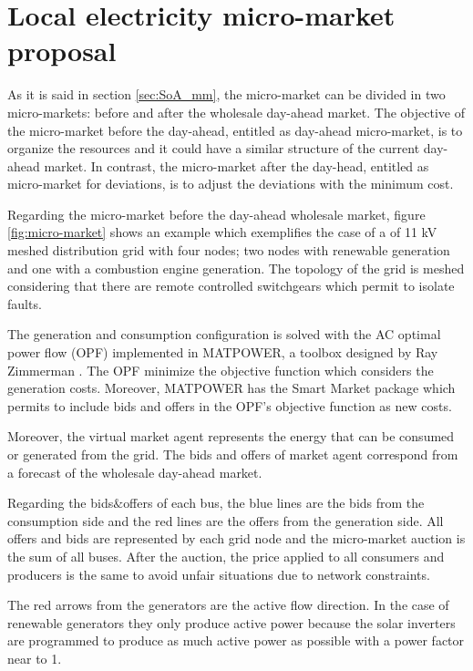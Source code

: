 \documentclass[a4paper,11pt,twoside,openright]{report}
\begin{document}
\section{Local electricity micro-market proposal}

As it is said in section \ref{sec:SoA_mm}, the micro-market can be divided in two micro-markets: before and after the wholesale day-ahead market. 
The objective of the micro-market before the day-ahead, entitled as day-ahead micro-market, is to organize the resources and it could have a similar structure of the current day-ahead market.
In contrast, the micro-market after the day-head, entitled as micro-market for deviations, is to adjust the deviations with the minimum cost.

Regarding the micro-market before the day-ahead wholesale market, figure \ref{fig:micro-market} shows an example which exemplifies the case of a  of 11 kV meshed distribution grid with four nodes; two nodes with renewable generation and one with a combustion engine generation. The topology of the grid is meshed considering that there are remote controlled switchgears which permit to isolate faults.

The generation and consumption configuration is solved with the AC optimal power flow (OPF) implemented in MATPOWER, a toolbox designed by Ray Zimmerman \cite{MATPOOWER}. The OPF minimize the objective function which considers the generation costs. Moreover, MATPOWER has the Smart Market package which permits to include bids and offers in the OPF's objective function as new costs.

Moreover, the virtual market agent represents the energy that can be consumed or generated from the grid. The bids and offers of market agent correspond from a forecast of the wholesale day-ahead market.

Regarding the bids$\&$offers of each bus, the blue lines are the bids from the consumption side and the red lines are the offers from the generation side. All offers and bids are represented by each grid node and the micro-market auction is the sum of all buses. After the auction, the price applied to all consumers and producers is the same to avoid unfair situations due to network constraints.

The red arrows from the generators are the active flow direction. In the case of renewable generators they only produce active power because the solar inverters are programmed to produce as much active power as possible with a power factor near to 1.
\end{document}
